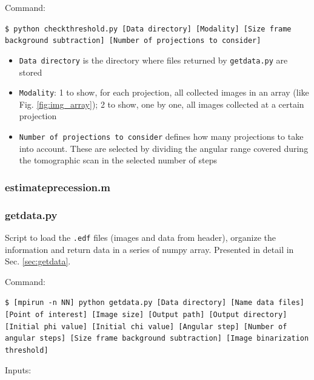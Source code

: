\documentclass[11pt]{scrartcl}
\begin{document}
Command: 

{\texttt{\$ python check\textunderscore threshold.py [Data directory] [Modality] [Size frame background subtraction] [Number of projections to consider]}}

\begin{itemize}
    \item {\texttt{Data directory}} is the directory where files returned by {\texttt{getdata.py}} are stored
    \item {\texttt{Modality}}: 1 to show, for each projection, all collected images in an array (like Fig. \ref{fig:img_array}); 2 to show, one by one, all images collected at a certain projection
    \item {\texttt{Number of projections to consider}} defines how many projections to take into account. These are selected by dividing the angular range covered during the tomographic scan in the selected number of steps
\end{itemize}

\subsubsection{estimate\textunderscore precession.m}



\subsubsection{getdata.py}

Script to load the {\texttt{.edf}} files (images and data from header), organize the information and return data in a series of numpy array. Presented in detail in Sec. \ref{sec:getdata}. 

Command:

{\texttt{\$ [mpirun -n NN] python getdata.py [Data directory] [Name data files] [Point of interest] [Image size] [Output path] [Output directory] [Initial phi value] [Initial chi value] [Angular step] [Number of angular steps] [Size frame background subtraction] [Image binarization threshold]}}

Inputs:
\end{document}
